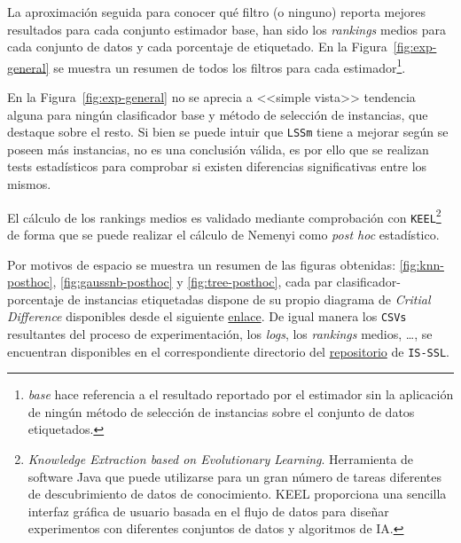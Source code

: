 La aproximación seguida para conocer qué filtro (o ninguno) reporta mejores resultados para cada conjunto estimador base, han sido los \textit{rankings} medios para cada conjunto de datos y cada porcentaje de etiquetado. En la Figura~\ref{fig:exp-general} se muestra un resumen de todos los filtros para cada estimador\footnote{\emph{base} hace referencia a el resultado reportado por el estimador sin la aplicación de ningún método de selección de instancias sobre el conjunto de datos etiquetados.}. 


En la Figura~\ref{fig:exp-general} no se aprecia a <<simple vista>> tendencia alguna para ningún clasificador base y método de selección de instancias, que destaque sobre el resto. Si bien se puede intuir que \texttt{LSSm} tiene a mejorar según se poseen más instancias, no es una conclusión válida, es por ello que se realizan tests estadísticos para comprobar si existen diferencias significativas entre los mismos.

El cálculo de los rankings medios es validado mediante comprobación con \texttt{KEEL}\footnote{\textit{Knowledge Extraction based on Evolutionary Learning}. Herramienta de software Java que puede utilizarse para un gran número de tareas diferentes de descubrimiento de datos de conocimiento. KEEL proporciona una sencilla interfaz gráfica de usuario basada en el flujo de datos para diseñar experimentos con diferentes conjuntos de datos y algoritmos de IA.}~\cite{alcala2009keel, alcala2011keel} de forma que se puede realizar el cálculo de Nemenyi como \textit{post hoc} estadístico. 

Por motivos de espacio se muestra un resumen de las figuras obtenidas: \ref{fig:knn-posthoc}, \ref{fig:gaussnb-posthoc} y \ref{fig:tree-posthoc},  cada par clasificador-porcentaje de instancias etiquetadas dispone de su propio diagrama de \emph{Critial Difference} disponibles desde el siguiente \href{https://github.com/dpr1005/Semisupervised-learning-and-instance-selection-methods/tree/main/experimentation/result_plots}{enlace}. De igual manera los \texttt{CSVs} resultantes del proceso de experimentación, los \textit{logs}, los \textit{rankings} medios, \dots, se encuentran disponibles en el correspondiente directorio del \href{https://github.com/dpr1005/Semisupervised-learning-and-instance-selection-methods/tree/main/experimentation}{repositorio} de \texttt{IS-SSL}.

